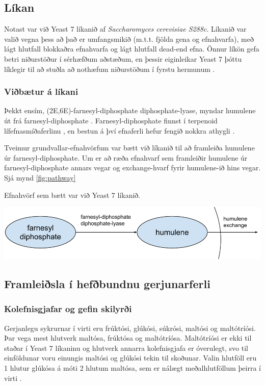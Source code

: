 \documentclass[11pt]{article}
\makeatletter
\newenvironment{figureonecolumn}{\begin{minipage}{\linewidth}\begin{center}\def\@captype{figure}}{\end{center}\end{minipage}}
\makeatother
\begin{document}
\begin{multicols}{2}
\subsection{Líkan}
Notast var við Yeast 7 líkanið\cite{yeastsf} af \emph{Saccharomyces cerevisiae S288c}. Líkanið var valið vegna þess að það er umfangsmikið (m.t.t. fjölda gena og efnahvarfa), með lágt hlutfall blokkaðra efnahvarfa og lágt hlutfall dead-end efna. Önnur líkön gefa betri niðurstöður í sérhæfðum aðstæðum, en þessir eiginleikar Yeast 7 þóttu líklegir til að stuðla að nothæfum niðurstöðum í fyrstu hermunum \cite{heavner2015comparative}.

\subsubsection{Viðbætur á líkani}
Þekkt ensím, (2E,6E)-farnesyl-diphosphate diphosphate-lyase, myndar humulene út frá farnesyl-diphosphate \cite[KEGG: R08373]{Kanehisa01012000}. Farnesyl-diphosphate finnst í terpenoid lífefnasmíðaferlinu \cite[KEGG: rn00900]{Kanehisa01012000}, en bestun á því efnaferli hefur fengið nokkra athygli \cite{BIT:BIT21216,misawa2011pathway,asadollahi2008production}.

Tveimur grundvallar-efnahvörfum var bætt við líkanið til að framleiða humulene úr farnesyl-diphosphate.
Um er að ræða efnahvarf sem framleiðir humulene úr farnesyl-diphosphate annars vegar og exchange-hvarf fyrir humulene-ið hins vegar. Sjá mynd \ref{fig:pathway}

\begin{figureonecolumn}
\caption[Viðbætur við Yeast 7]{Efnahvörf sem bætt var við Yeast 7 líkanið.}
\label{fig:pathway}
\includegraphics[width=\linewidth]{Pics/HumuleneAddition}
\end{figureonecolumn}
\subsection{Framleiðsla í hefðbundnu gerjunarferli}
\label{sec:hefdbundid}
\subsubsection{Kolefnisgjafar og gefin skilyrði}
Gerjanlegu sykrurnar í virti eru frúktósi, glúkósi, súkrósi, maltósi og maltótríósi. Þar vega mest hlutverk maltósa, frúktósa og maltótríósa. Maltótríósi er ekki til staðar í Yeast 7 líkaninu og hlutverk annarra kolefnisgjafa er óverulegt, svo til einföldunar voru einungis maltósi og glúkósi tekin til skoðunar. Valin hlutföll eru 1 hlutur glúkósa á móti 2 hlutum maltósa, sem er nálægt meðalhlutföllum þeirra í virti \cite{otter1967determination}. 


\end{multicols}
\end{document}
